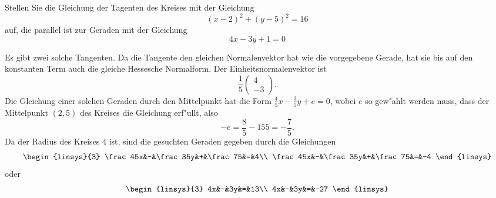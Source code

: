 Stellen Sie die Gleichung der Tagenten des Kreises mit der Gleichung
\[
(x-2)^2+(y-5)^2=16
\]
auf, die parallel ist zur Geraden mit der Gleichung
\[
4x-3y+1=0
\]

\begin{loesung}
Es gibt zwei solche Tangenten. Da die Tangente den gleichen Normalenvektor
hat wie die vorgegebene Gerade, hat sie bis auf den konstanten Term
auch die gleiche Hessesche Normalform. Der Einheitsnormalenvektor
ist
\[
\frac15\begin{pmatrix}4\\-3\end{pmatrix}.
\]
Die Gleichung einer solchen Geraden durch den Mittelpunkt hat
die Form $\frac45x-\frac35y+e=0$, wobei $e$ so gew"ahlt werden
muss, dass der Mittelpunkt $(2,5)$ des Kreises die Gleichung
erf"ullt, also
\[
-e=\frac85-{15}5=-\frac75.
\]
Da der Radius des Kreises $4$ ist, sind die gesuchten Geraden gegeben
durch die Gleichungen
\[
\begin{linsys}{3}
\frac45x&-&\frac35y&+&\frac75&=&4\\
\frac45x&-&\frac35y&+&\frac75&=&-4
\end{linsys}
\]
oder
\[
\begin{linsys}{3}
4x&-&3y&=&13\\
4x&-&3y&=&-27
\end{linsys}
\]
\end{loesung}
